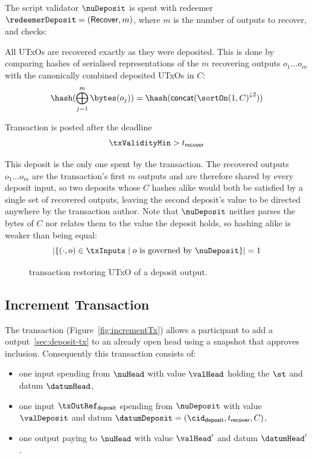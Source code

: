 \noindent The script validator $\nuDeposit$ is spent with redeemer
$\redeemerDeposit = (\mathsf{Recover}, m)$, where $m$ is the number of outputs
to recover, and checks:
\begin{menumerate}
	\item All UTxOs are recovered exactly as they were deposited. This is done by
	comparing hashes of serialised representations of the $m$ recovering outputs
	$o_{1} \dots o_{m}$ with the canonically combined deposited UTxOs in $C$:
	\[
		\hash(\bigoplus_{j=1}^{m} \bytes(o_{j})) = \hash(\mathsf{concat}({\sortOn(1, C)}^{\downarrow2}))
	\]
	\item Transaction is posted after the deadline
	\[
		\txValidityMin > t_{\mathsf{recover}}
	\]
	\item This deposit is the only one spent by the transaction. The recovered
	outputs $o_{1} \dots o_{m}$ are the transaction's first $m$ outputs and are
	therefore shared by every deposit input, so two deposits whose $C$ hashes
	alike would both be satisfied by a single set of recovered outputs, leaving
	the second deposit's value to be directed anywhere by the transaction author.
	Note that $\nuDeposit$ neither parses the bytes of $C$ nor relates them to the
	value the deposit holds, so hashing alike is weaker than being equal:
	\[
		|\{ (\cdot, o) \in \txInputs \mid o \text{ is governed by } \nuDeposit \}| = 1
	\]
\end{menumerate}

\begin{figure}[H]
	\centering
	
	\caption{\mtxRecover{} transaction restoring UTxO of a deposit
		output.}\label{fig:recoverTx}
\end{figure}

\subsection{Increment Transaction}\label{sec:increment-tx}

\noindent The \mtxIncrement{} transaction (Figure~\ref{fig:incrementTx}) allows
a participant to add a \mtxDeposit{} output~\ref{sec:deposit-tx} to an already
open head using a snapshot that approves inclusion. Consequently this
transaction consists of:

\begin{itemize}
	\item one input spending from $\nuHead$ with value $\valHead$ holding the
	      $\st$ and datum $\datumHead$,
	\item one input $\txOutRef_{\mathsf{deposit}}$ spending from $\nuDeposit$ with value $\valDeposit$ and datum
	      $\datumDeposit = (\cid_{\mathsf{deposit}}, t_{\mathsf{recover}}, C)$,
	\item one output paying to $\nuHead$ with value $\valHead'$ and datum
	      $\datumHead'$.
\end{itemize}


